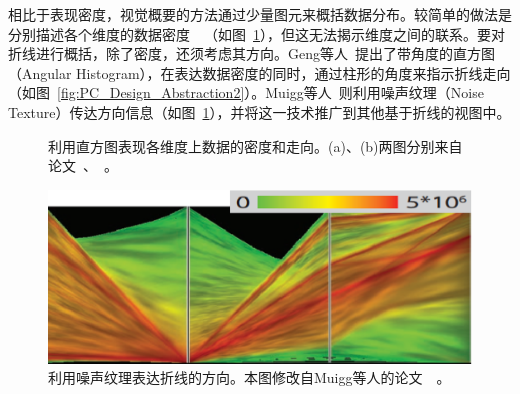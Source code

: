 \documentclass[12pt,twocolumn]{article}
\begin{document}
相比于表现密度，视觉概要的方法通过少量图元来概括数据分布。较简单的做法是分别描述各个维度的数据密度~\citep{hauser2002angular}~\citep{caat2007design}（如图~\ref{fig:PC_Design_Abstraction1}），但这无法揭示维度之间的联系。要对折线进行概括，除了密度，还须考虑其方向。Geng等人~\citep{geng2011angular}提出了带角度的直方图（Angular Histogram），在表达数据密度的同时，通过柱形的角度来指示折线走向（如图~\ref{fig:PC_Design_Abstraction2}）。Muigg等人~\citep{muigg2011visual}则利用噪声纹理（Noise Texture）传达方向信息（如图~\ref{fig:PC_Design_Abstraction1}），并将这一技术推广到其他基于折线的视图中。

\begin{figure}[!htb]
\centering
{}
\caption{利用直方图表现各维度上数据的密度和走向。(a)、(b)两图分别来自论文~\citep{hauser2002angular}、~\citep{geng2011angular}。}
\end{figure}

\begin{figure}[!htb]
\centering
\includegraphics[width=0.8\linewidth]{images/PC_Design_Abstraction3.eps}
\caption{\label{fig:PC_Design_Abstraction1}利用噪声纹理表达折线的方向。本图修改自Muigg等人的论文~\citep{muigg2011visual}~。
}
\end{figure}
\end{document}
